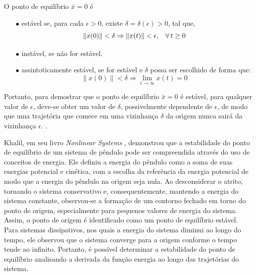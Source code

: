 \begin{definition}
  O ponto de equilíbrio $\bar{x} = 0$ é

  \begin{enumerate}
    \item[$\bullet$] estável se, para cada $\epsilon > 0$, existe $\delta = \delta(\epsilon) > 0$, tal que,
          $$ \lVert x(0)\rVert < \delta \Rightarrow \lVert x(t)\rVert < \epsilon, \hspace{0.3cm} \forall \, t \geq 0$$
    \item[$\bullet$] instável, se não for estável.
    \item[$\bullet$] assintoticamente estável, se for estável e $\delta$ possa   ser escolhido de forma que:
          $$ \lVert x(0)\rVert < \delta \Rightarrow \lim_{t \rightarrow \infty}x(t) = 0$$
  \end{enumerate}
\end{definition}

Portanto, para demostrar que o ponto de equilíbrio $\bar{x} = 0$ é estável, para qualquer valor de $\epsilon$, deve-se obter um valor de $\delta$, possivelmente dependente de $\epsilon$, de modo que uma trajetória que comece em uma vizinhança $\delta$ da origem nunca sairá da vizinhança $\epsilon$. \cite{khalil2002}.

Khalil, em seu livro \textit{Nonlinear Systems} \citep{khalil2002}, demonstrou que a estabilidade do ponto de equilíbrio de um sistema de pêndulo pode ser compreendida através do uso de conceitos de energia. Ele definiu a energia do pêndulo como a soma de suas energias potencial e cinética, com a escolha da referência da energia potencial de modo que a energia do pêndulo na origem seja nula. Ao desconsiderar o atrito, tornando o sistema conservativo e, consequentemente, mantendo a energia do sistema constante, observou-se a formação de um contorno fechado em torno do ponto de origem, especialmente para pequenos valores de energia do sistema. Assim, o ponto de origem é identificado como um ponto de equilíbrio estável. Para sistemas dissipativos, nos quais a energia do sistema diminui ao longo do tempo, ele observou que o sistema converge para a origem conforme o tempo tende ao infinito. Portanto, é possível determinar a estabilidade do ponto de equilíbrio analisando a derivada da função energia ao longo das trajetórias do sistema.

